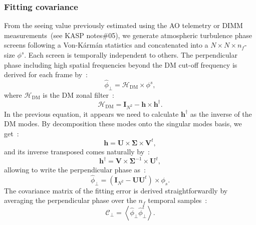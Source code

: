 \documentclass[12pt]{article}
\newcommand{\para}[1]{\left(#1\right)}
\newcommand{\aver}[1]{\left\langle #1 \right\rangle}
\begin{document}
\subsubsection{Fitting covariance}
From the seeing value previously estimated using the AO telemetry or DIMM measurements~(see KASP notes\#05), we generate atmospheric turbulence phase screens following a Von-K\'arm\'an statistics and concatenated into a $N\times N\times n_f$-size $\phi^s$. Each screen is temporally independent to others. The perpendicular phase including high spatial frequencies beyond the DM cut-off frequency is derived for each frame by~:
\begin{equation}
\widehat{\phi}_{\perp} = \mathcal{H}_\text{DM}\times\phi^s,
\end{equation}
where $\mathcal{H}_\text{DM}$ is the DM zonal filter~:
\begin{equation}
	\mathcal{H}_\text{DM} = \boldsymbol{I}_{N^2} - \boldsymbol{h} \times  \boldsymbol{h}^{\dagger}.	
\end{equation}
In the previous equation, it appears we need to calculate $\boldsymbol{h}^{\dagger} $ as the inverse of the DM modes. By decomposition these modes onto the singular modes basis, we get~:
\begin{equation}
	\boldsymbol{h} = \boldsymbol{U} \times \boldsymbol{\Sigma} \times \boldsymbol{V}^t,
\end{equation}
and its inverse transposed comes naturally by~:
\begin{equation}
\boldsymbol{h}^{\dagger} = \boldsymbol{V} \times \boldsymbol{\Sigma}^{-1} \times \boldsymbol{U}^t,
\end{equation}
allowing to write the perpendicular phase as~:
\begin{equation}
	\widehat{\phi}_{\perp} = \para{\boldsymbol{I}_{N^2} - \boldsymbol{U}\boldsymbol{U}^t}\times\phi_s.
\end{equation}
The covariance matrix of the fitting error is derived straightforwardly by averaging the perpendicular phase over the $n_f$ temporal samples~:
\begin{equation}
	\mathcal{C}_\perp = \aver{\widehat{\phi}_{\perp}\widehat{\phi}^t_{\perp}}.
\end{equation}
\end{document}
